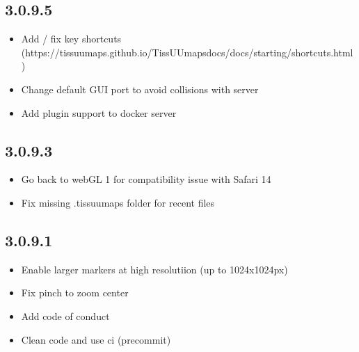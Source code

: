 \documentclass[letterpaper,10pt,english,openany,oneside]{sphinxmanual}
\begin{document}
\subsection{3.0.9.5}
\label{\detokenize{docs/intro/versions:id31}}\begin{itemize}
\item {} 
\sphinxAtStartPar
Add / fix key shortcuts (https://tissuumaps.github.io/TissUUmaps\sphinxhyphen{}docs/docs/starting/shortcuts.html)

\item {} 
\sphinxAtStartPar
Change default GUI port to avoid collisions with server

\item {} 
\sphinxAtStartPar
Add plugin support to docker server

\end{itemize}


\subsection{3.0.9.3}
\label{\detokenize{docs/intro/versions:id32}}\begin{itemize}
\item {} 
\sphinxAtStartPar
Go back to webGL 1 for compatibility issue with Safari 14

\item {} 
\sphinxAtStartPar
Fix missing .tissuumaps folder for recent files

\end{itemize}


\subsection{3.0.9.1}
\label{\detokenize{docs/intro/versions:id33}}\begin{itemize}
\item {} 
\sphinxAtStartPar
Enable larger markers at high resolutiion (up to 1024x1024px)

\item {} 
\sphinxAtStartPar
Fix pinch to zoom center

\item {} 
\sphinxAtStartPar
Add code of conduct

\item {} 
\sphinxAtStartPar
Clean code and use ci (pre\sphinxhyphen{}commit)

\end{itemize}
\end{document}
